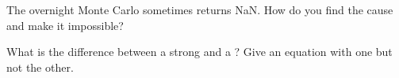 \begin{interviewq}\label{iq:qm:stochastic-differential-equations:5}
The overnight Monte Carlo sometimes returns NaN. How do you find the cause and make it
impossible?
\end{interviewq}

\begin{interviewq}\label{iq:qm:stochastic-differential-equations:6}
What is the difference between a strong and a ? Give an equation with one but not
the other.
\end{interviewq}
